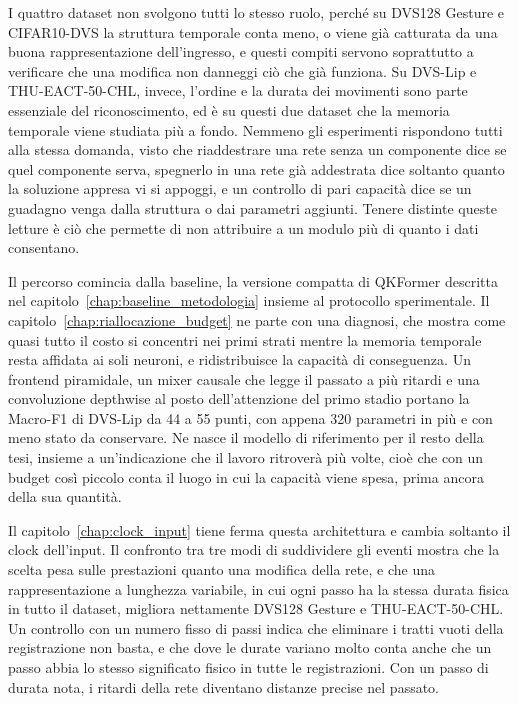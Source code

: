 I quattro dataset non svolgono tutti lo stesso ruolo, perché su DVS128 Gesture e CIFAR10-DVS la struttura temporale conta meno, o viene già catturata da una buona rappresentazione dell'ingresso, e questi compiti servono soprattutto a verificare che una modifica non danneggi ciò che già funziona. Su DVS-Lip e THU-EACT-50-CHL, invece, l'ordine e la durata dei movimenti sono parte essenziale del riconoscimento, ed è su questi due dataset che la memoria temporale viene studiata più a fondo. Nemmeno gli esperimenti rispondono tutti alla stessa domanda, visto che riaddestrare una rete senza un componente dice se quel componente serva, spegnerlo in una rete già addestrata dice soltanto quanto la soluzione appresa vi si appoggi, e un controllo di pari capacità dice se un guadagno venga dalla struttura o dai parametri aggiunti. Tenere distinte queste letture è ciò che permette di non attribuire a un modulo più di quanto i dati consentano.

Il percorso comincia dalla baseline, la versione compatta di QKFormer descritta nel capitolo~\ref{chap:baseline_metodologia} insieme al protocollo sperimentale. Il capitolo~\ref{chap:riallocazione_budget} ne parte con una diagnosi, che mostra come quasi tutto il costo si concentri nei primi strati mentre la memoria temporale resta affidata ai soli neuroni, e ridistribuisce la capacità di conseguenza. Un frontend piramidale, un mixer causale che legge il passato a più ritardi e una convoluzione depthwise al posto dell'attenzione del primo stadio portano la Macro-F1 di DVS-Lip da 44 a 55 punti, con appena 320 parametri in più e con meno stato da conservare. Ne nasce il modello di riferimento per il resto della tesi, insieme a un'indicazione che il lavoro ritroverà più volte, cioè che con un budget così piccolo conta il luogo in cui la capacità viene spesa, prima ancora della sua quantità.

Il capitolo~\ref{chap:clock_input} tiene ferma questa architettura e cambia soltanto il clock dell'input. Il confronto tra tre modi di suddividere gli eventi mostra che la scelta pesa sulle prestazioni quanto una modifica della rete, e che una rappresentazione a lunghezza variabile, in cui ogni passo ha la stessa durata fisica in tutto il dataset, migliora nettamente DVS128 Gesture e THU-EACT-50-CHL. Un controllo con un numero fisso di passi indica che eliminare i tratti vuoti della registrazione non basta, e che dove le durate variano molto conta anche che un passo abbia lo stesso significato fisico in tutte le registrazioni. Con un passo di durata nota, i ritardi della rete diventano distanze precise nel passato.

